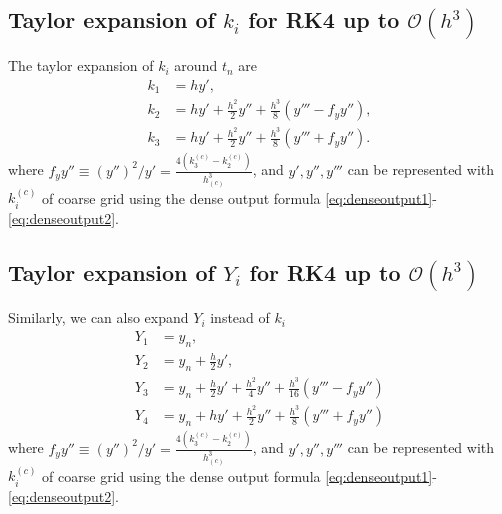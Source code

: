 \documentclass[prd,aps,a4paper,superscriptaddress,onecolumn,footinbib]{revtex4}
\begin{document}
\subsection{Taylor expansion of $k_i$ for RK4 up to $\mathcal{O}(h^3)$}

The taylor expansion of $k_i$ around $t_n$ are \cite{mongwane2015toward}
\begin{align}
    k_1&=hy', \\
    k_2&=hy'+\frac{h^2}{2}y''+\frac{h^3}{8}(y'''-f_yy''), \\
    k_3&=hy'+\frac{h^2}{2}y''+\frac{h^3}{8}(y'''+f_yy'').
\end{align}
where
$f_yy''\equiv\left(y''\right)^2/y'=\frac{4(k^{(c)}_3-k^{(c)}_2)}{h^3_{(c)}}$,
and $y',y'',y'''$ can be represented with $k^{(c)}_i$ of coarse grid using the dense output formula \eqref{eq:denseoutput1}-\eqref{eq:denseoutput2}.

\subsection{Taylor expansion of $Y_i$ for RK4 up to $\mathcal{O}(h^3)$}

Similarly, we can also expand $Y_i$ instead of $k_i$ \cite{mccorquodale2011high}
\begin{align}
    Y_1&=y_n, \label{eq:Y1} \\
    Y_2&=y_n + \frac{h}{2}y', \label{eq:Y2} \\
    Y_3&=y_n + \frac{h}{2}y' + \frac{h^2}{4}y''+\frac{h^3}{16}(y'''-f_yy'') \label{eq:Y3} \\
    Y_4&=y_n + hy' + \frac{h^2}{2}y''+\frac{h^3}{8}(y'''+f_yy'') \label{eq:Y4}
\end{align}
where $f_yy''\equiv\left(y''\right)^2/y'=\frac{4(k^{(c)}_3-k^{(c)}_2)}{h^3_{(c)}}$,
and $y',y'',y'''$ can be represented with $k^{(c)}_i$ of coarse grid using the dense output formula \eqref{eq:denseoutput1}-\eqref{eq:denseoutput2}.
\end{document}
